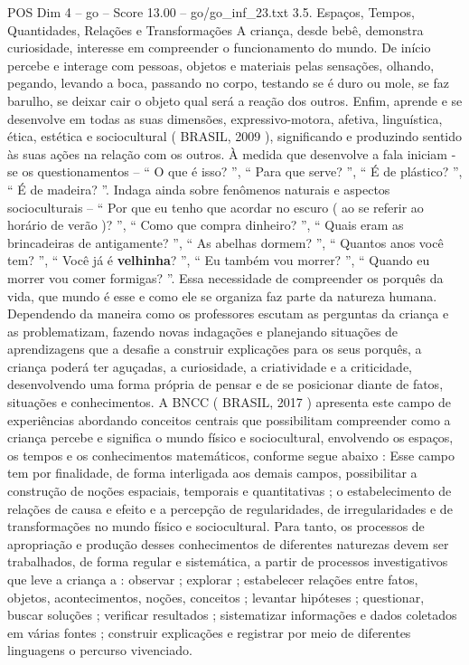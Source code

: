 \begin{textsample}{POS Dim 4 – go – Score 13.00 – go/go\_inf\_23.txt}  \label{ex:f4_pos_066}
3.5.
Espaços, Tempos, Quantidades, Relações e Transformações A criança, desde bebê, demonstra curiosidade, interesse em compreender o funcionamento do mundo.
De início percebe e interage com pessoas, objetos e materiais pelas sensações, olhando, pegando, levando a boca, passando no corpo, testando se é duro ou mole, se faz barulho, se deixar cair o objeto qual será a reação dos outros.
Enfim, aprende e se desenvolve em todas as suas dimensões, expressivo-motora, afetiva, linguística, ética, estética e sociocultural ( BRASIL, 2009 ), significando e produzindo sentido às suas ações na relação com os outros.
À medida que desenvolve a fala iniciam -se os questionamentos – “ O que é isso? ”, “ Para que serve? ”, “ É de plástico? ”, “ É de madeira? ”.
Indaga ainda sobre fenômenos naturais e aspectos socioculturais – “ Por que eu tenho que acordar no escuro ( ao se referir ao horário de verão )? ”, “ Como que compra dinheiro? ”, “ Quais eram as brincadeiras de antigamente? ”, “ As abelhas dormem? ”, “ Quantos anos você tem? ”, “ Você já é \textbf{velhinha}? ”, “ Eu também vou morrer? ”, “ Quando eu morrer vou comer formigas? ”.
Essa necessidade de compreender os porquês da vida, que mundo é esse e como ele se organiza faz parte da natureza humana.
Dependendo da maneira como os professores escutam as perguntas da criança e as problematizam, fazendo novas indagações e planejando situações de aprendizagens que a desafie a construir explicações para os seus porquês, a criança poderá ter aguçadas, a curiosidade, a criatividade e a criticidade, desenvolvendo uma forma própria de pensar e de se posicionar diante de fatos, situações e conhecimentos.
A BNCC ( BRASIL, 2017 ) apresenta este campo de experiências abordando conceitos centrais que possibilitam compreender como a criança percebe e significa o mundo físico e sociocultural, envolvendo os espaços, os tempos e os conhecimentos matemáticos, conforme segue abaixo : Esse campo tem por finalidade, de forma interligada aos demais campos, possibilitar a construção de noções espaciais, temporais e quantitativas ; o estabelecimento de relações de causa e efeito e a percepção de regularidades, de irregularidades e de transformações no mundo físico e sociocultural.
Para tanto, os processos de apropriação e produção desses conhecimentos de diferentes naturezas devem ser trabalhados, de forma regular e sistemática, a partir de processos investigativos que leve a criança a : observar ; explorar ; estabelecer relações entre fatos, objetos, acontecimentos, noções, conceitos ; levantar hipóteses ; questionar, buscar soluções ; verificar resultados ; sistematizar informações e dados coletados em várias fontes ; construir explicações e registrar por meio de diferentes linguagens o percurso vivenciado.

\end{textsample}
